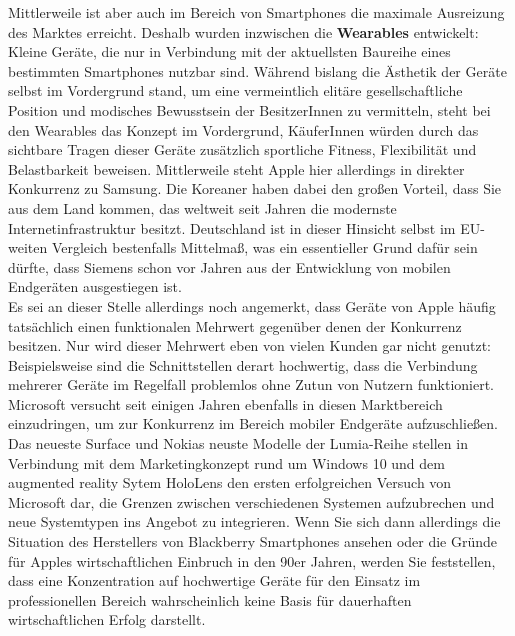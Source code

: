 Mittlerweile ist aber auch im Bereich von Smartphones die maximale Ausreizung des Marktes erreicht. Deshalb wurden inzwischen die \textbf{Wearables} entwickelt: Kleine Geräte, die nur in Verbindung mit der aktuellsten Baureihe eines bestimmten Smartphones nutzbar sind. Während bislang die Ästhetik der Geräte selbst im Vordergrund stand, um eine vermeintlich elitäre gesellschaftliche Position und modisches Bewusstsein der BesitzerInnen zu vermitteln, steht bei den Wearables das Konzept im Vordergrund, KäuferInnen würden durch das sichtbare Tragen dieser Geräte zusätzlich sportliche Fitness, Flexibilität und Belastbarkeit beweisen. Mittlerweile steht Apple hier allerdings in direkter Konkurrenz zu Samsung. Die Koreaner haben dabei den großen Vorteil, dass Sie aus dem Land kommen, das weltweit seit Jahren die modernste Internetinfrastruktur besitzt. Deutschland ist in dieser Hinsicht selbst im EU-weiten Vergleich bestenfalls Mittelmaß, was ein essentieller Grund dafür sein dürfte, dass Siemens schon vor Jahren aus der Entwicklung von mobilen Endgeräten ausgestiegen ist.\\

Es sei an dieser Stelle allerdings noch angemerkt, dass Geräte von Apple häufig tatsächlich einen funktionalen Mehrwert gegenüber denen der Konkurrenz besitzen. Nur wird dieser Mehrwert eben von vielen Kunden gar nicht genutzt: Beispielsweise sind die Schnittstellen derart hochwertig, dass die Verbindung mehrerer Geräte im Regelfall problemlos ohne Zutun von Nutzern funktioniert. Microsoft versucht seit einigen Jahren ebenfalls in diesen Marktbereich einzudringen, um zur Konkurrenz im Bereich mobiler Endgeräte aufzuschließen. Das neueste Surface und Nokias neuste Modelle der Lumia-Reihe stellen in Verbindung mit dem Marketingkonzept rund um Windows 10 und dem augmented reality Sytem HoloLens den ersten erfolgreichen Versuch von Microsoft dar, die Grenzen zwischen verschiedenen Systemen aufzubrechen und neue Systemtypen ins Angebot zu integrieren. Wenn Sie sich dann allerdings die Situation des Herstellers von Blackberry Smartphones ansehen oder die Gründe für Apples wirtschaftlichen Einbruch in den 90er Jahren, werden Sie feststellen, dass eine Konzentration auf hochwertige Geräte für den Einsatz im professionellen Bereich wahrscheinlich keine Basis für dauerhaften wirtschaftlichen Erfolg darstellt.\\

